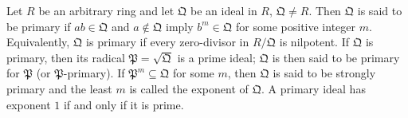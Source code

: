 Let $R$ be an arbitrary ring and let $\mathfrak{Q}$ be an ideal in $R$, $\mathfrak{Q} \neq R$. Then $\mathfrak{Q}$ is said to be primary if $ab \in \mathfrak{Q}$ and $a \notin \mathfrak{Q}$ imply $b^m \in \mathfrak{Q}$ for some positive integer $m$. Equivalently, $\mathfrak{Q}$ is primary if every zero-divisor in $R/\mathfrak{Q}$ is nilpotent. If $\mathfrak{Q}$ is primary, then its radical $\mathfrak{P} = \sqrt{\mathfrak{Q}}$ is a prime ideal; $\mathfrak{Q}$ is then said to be primary for $\mathfrak{P}$ (or $\mathfrak{P}$-primary). If $\mathfrak{P}^m \subseteq \mathfrak{Q}$ for some $m$, then $\mathfrak{Q}$ is said to be strongly primary and the least $m$ is called the exponent of $\mathfrak{Q}$. A primary ideal has exponent $1$ if and only if it is prime.
